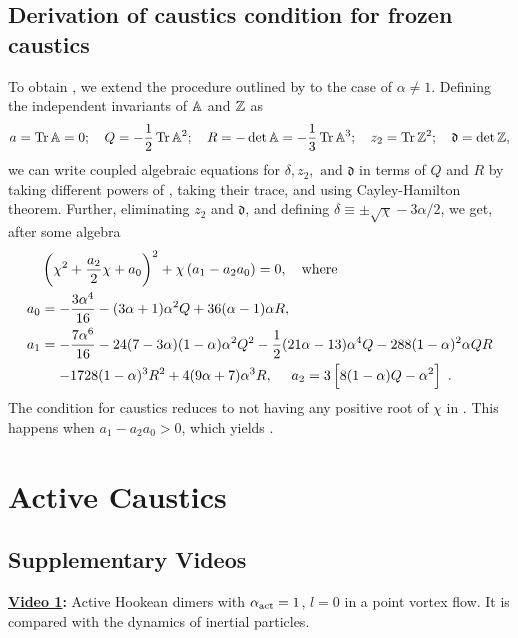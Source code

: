 \documentclass[../Rajarshi-thesis-draft.tex]{subfiles}
\begin{document}
\section{Derivation of caustics condition for frozen caustics} \label{int-caus-reg-drv}
To obtain , we extend the procedure outlined by \cite{meibohm2023} to the case of $\alpha \ne 1$. Defining the independent invariants of $\mathbb{A}$ and $\mathbb{Z}$ as
\begin{align}
\begin{split}
  a = \operatorname{Tr}{\mathbb{A}} = 0; \quad Q = -\frac{1}{2}\operatorname{Tr}{\mathbb{A}^2}; \quad R = - \det{\mathbb{A}} = -\frac{1}{3}\operatorname{Tr}{\mathbb{A}^3};
\quad z_2 = \operatorname{Tr}{\mathbb{Z}^2}; \quad \mathfrak{d} =  \det{\mathbb{Z}},
\end{split}
\end{align}
we can write coupled algebraic equations for $\delta,z_2,\text{ and }\mathfrak{d}$ in terms of $Q$ and $R$ by taking different powers of , taking their trace, and using Cayley-Hamilton theorem. Further, eliminating $z_2$ and $\mathfrak{d}$, and defining  $\delta \equiv \pm \sqrt{\chi} - 3\alpha/2$, we get, after some algebra
\begin{align}
\begin{split}
   & \left(\chi^2 + \frac{a_2 }{2}\chi + a_0\right)^2 +  \chi\left(a_1 - a_2a_0\right) = 0, \quad {\rm where} \label{int-pol4}\\
    a_0 &=  -\frac{3 \alpha ^4}{16}-(3 \alpha +1) \alpha ^2 Q+36 (\alpha -1) \alpha  R, \\
    a_1 &=-\frac{7 \alpha ^6}{16}-24 (7-3 \alpha ) (1-\alpha ) \alpha ^2 Q^2-\frac{1}{2} (21 \alpha -13) \alpha ^4 Q-288 (1-\alpha )^2 \alpha  Q R\\&\mathrel{\phantom{ =} }-1728 (1-\alpha )^3 R^2+4 (9 \alpha +7) \alpha ^3 R, \quad
    {\rm } \ a_2 = 3 \left[8 (1-\alpha ) Q-\alpha ^2\right]\ .
\end{split}
\end{align}
The condition for caustics reduces to not having any positive root of $\chi$ in . This happens when $a_1 - a_2a_0 > 0$, which yields .

\chapter{Active Caustics}

\section{Supplementary Videos}
\label{act-videos}
\textbf{\href{https://office365stanford-my.sharepoint.com/:v:/g/personal/rchajwa_stanford_edu/EU2dPLsDJGVOjePmOh_22aEBiQbmSoQjO7OQmnt6cHVS6g?nav=eyJyZWZlcnJhbEluZm8iOnsicmVmZXJyYWxBcHAiOiJPbmVEcml2ZUZvckJ1c2luZXNzIiwicmVmZXJyYWxBcHBQbGF0Zm9ybSI6IldlYiIsInJlZmVycmFsTW9kZSI6InZpZXciLCJyZWZlcnJhbFZpZXciOiJNeUZpbGVzTGlua0NvcHkifX0&e=M0zgMJ}{Video 1}:} Active Hookean dimers with $\alpha_{\rm act} =1$, $l = 0$ in a point vortex flow. It is compared with the dynamics of inertial particles.
\end{document}

